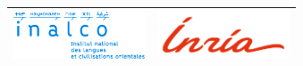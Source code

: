 
\thispagestyle{empty}

\begin{center}
  \begin{tabularx}{\textwidth}{m{10.3cm}m{4cm}}
	 \includegraphics[width = 3.9cm]{z_images/0_logos/0_inalco.png} %
	&
	 \includegraphics[width = 3.9cm]{z_images/0_logos/1_inria.png} %
        \\ \hline
  \end{tabularx}
\end{center}

